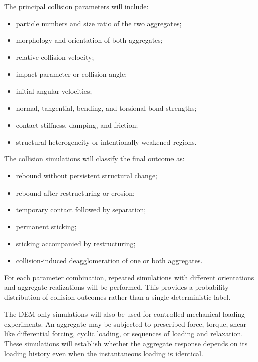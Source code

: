 \documentclass[11pt,a4paper,twoside]{scrartcl}
\begin{document}
The principal collision parameters will include:

\begin{itemize}
	\item particle numbers and size ratio of the two aggregates;
	
	\item morphology and orientation of both aggregates;
	
	\item relative collision velocity;
	
	\item impact parameter or collision angle;
	
	\item initial angular velocities;
	
	\item normal, tangential, bending, and torsional bond strengths;
	
	\item contact stiffness, damping, and friction;
	
	\item structural heterogeneity or intentionally weakened regions.
\end{itemize}

The collision simulations will classify the final outcome as:

\begin{itemize}
	\item rebound without persistent structural change;
	
	\item rebound after restructuring or erosion;
	
	\item temporary contact followed by separation;
	
	\item permanent sticking;
	
	\item sticking accompanied by restructuring;
	
	\item collision-induced deagglomeration of one or both aggregates.
\end{itemize}

For each parameter combination, repeated simulations with different orientations and aggregate realizations will be performed. This provides a probability distribution of collision outcomes rather than a single deterministic label.

The DEM-only simulations will also be used for controlled mechanical loading experiments. An aggregate may be subjected to prescribed force, torque, shear-like differential forcing, cyclic loading, or sequences of loading and relaxation. These simulations will establish whether the aggregate response depends on its loading history even when the instantaneous loading is identical.
\end{document}
